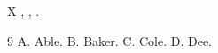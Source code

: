 \documentclass{article}
\begin{document}
X \cite{c,a,b,d}, \cite{b,a}, \cite{a}.
\begin{thebibliography}{9}
 A. Able.
 B. Baker.
 C. Cole.
 D. Dee.
\end{thebibliography}
\end{document}
